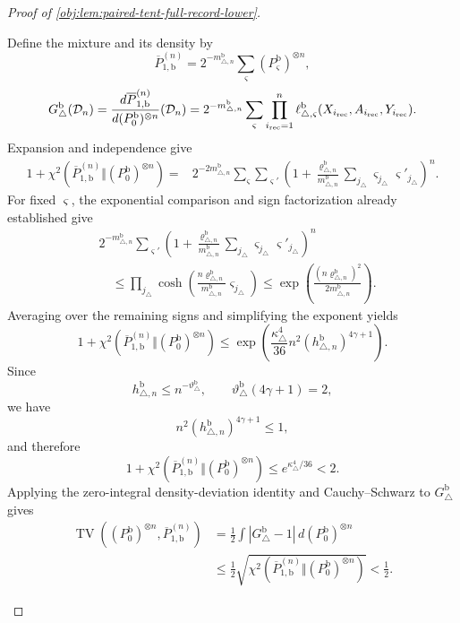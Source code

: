 \documentclass[11pt]{article}
\begin{document}
\begin{proof}[Proof of \cref{obj:lem:paired-tent-full-record-lower}]
\begin{enumerate}
Define the mixture and its density by
\[
\overline P_{1,\mathrm b}^{(n)}
=
2^{-m_{\triangle,n}^{\mathrm b}}
\sum_\varsigma(P_\varsigma^{\mathrm b})^{\otimes n},
\]
\[
G_\triangle^{\mathrm b}(\mathcal D_n)
=
\frac{d\overline P_{1,\mathrm b}^{(n)}}
 {d(P_0^{\mathrm b})^{\otimes n}}(\mathcal D_n)
=
2^{-m_{\triangle,n}^{\mathrm b}}
\sum_\varsigma\prod_{i_{\rm rec}=1}^n
\ell_{\triangle,\varsigma}^{\mathrm b}
(X_{i_{\rm rec}},A_{i_{\rm rec}},Y_{i_{\rm rec}}).
\]
Expansion and independence give
\[
\begin{aligned}
1+\chi^2\!\left(
\overline P_{1,\mathrm b}^{(n)}
\Vert(P_0^{\mathrm b})^{\otimes n}\right)
={}&2^{-2m_{\triangle,n}^{\mathrm b}}
\sum_\varsigma\sum_{\varsigma'}
\left(
1+\frac{\varrho_{\triangle,n}^{\mathrm b}}{m_{\triangle,n}^{\mathrm b}}
\sum_{j_\triangle}
\varsigma_{j_\triangle}\varsigma'_{j_\triangle}
\right)^n.
\end{aligned}
\]
For fixed \(\varsigma\), the exponential comparison and sign factorization
already established give
\[
\begin{aligned}
&2^{-m_{\triangle,n}^{\mathrm b}}\sum_{\varsigma'}
\left(
1+\frac{\varrho_{\triangle,n}^{\mathrm b}}{m_{\triangle,n}^{\mathrm b}}
\sum_{j_\triangle}
\varsigma_{j_\triangle}\varsigma'_{j_\triangle}
\right)^n\\
&\quad\le
\prod_{j_\triangle}
\cosh\left(
\frac{n\varrho_{\triangle,n}^{\mathrm b}}
 {m_{\triangle,n}^{\mathrm b}}\varsigma_{j_\triangle}
\right)
\le
\exp\left(
\frac{(n\varrho_{\triangle,n}^{\mathrm b})^2}
 {2m_{\triangle,n}^{\mathrm b}}\right).
\end{aligned}
\]
Averaging over the remaining signs and simplifying the exponent yields
\[
1+\chi^2\!\left(
\overline P_{1,\mathrm b}^{(n)}
\Vert(P_0^{\mathrm b})^{\otimes n}\right)
\le
\exp\left(
\frac{\kappa_\triangle^4}{36}
n^2(h_{\triangle,n}^{\mathrm b})^{4\gamma+1}
\right).
\]
Since
\[
h_{\triangle,n}^{\mathrm b}
\le n^{-\vartheta_\triangle^{\mathrm b}},
\qquad
\vartheta_\triangle^{\mathrm b}(4\gamma+1)=2,
\]
we have
\[
n^2(h_{\triangle,n}^{\mathrm b})^{4\gamma+1}\le1,
\]
and therefore
\[
1+\chi^2\!\left(
\overline P_{1,\mathrm b}^{(n)}
\Vert(P_0^{\mathrm b})^{\otimes n}\right)
\le e^{\kappa_\triangle^4/36}<2.
\]
Applying the zero-integral density-deviation identity and
Cauchy--Schwarz to \(G_\triangle^{\mathrm b}\) gives
\[
\begin{aligned}
\operatorname{TV}\!\left(
(P_0^{\mathrm b})^{\otimes n},\overline P_{1,\mathrm b}^{(n)}
\right)
&=
\frac12\int|G_\triangle^{\mathrm b}-1|\,d(P_0^{\mathrm b})^{\otimes n}\\
&\le
\frac12\sqrt{\chi^2\!\left(
\overline P_{1,\mathrm b}^{(n)}
\Vert(P_0^{\mathrm b})^{\otimes n}\right)}
<\frac12.
\end{aligned}
\]


\end{enumerate}
\end{proof}
\end{document}
